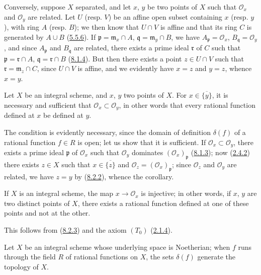 Conversely, suppose $X$ separated, and let $x$, $y$ be two points of $X$ such
that $\mathscr{O}_x$ and $\mathscr{O}_y$ are related. Let $U$ (resp.
$V$) be an affine open subset containing $x$ (resp. $y$), with ring $A$ (resp.
$B$); we then know that $U\cap V$ is affine and that its ring $C$ is generated
by $A\cup B$ (\hyperref[I.5.5.6]{5.5.6}). If
$\mathfrak p=\mathfrak m_x\cap A$, $\mathfrak q=\mathfrak m_y\cap B$, we have
$A_\mathfrak p=\mathscr{O}_x$, $B_\mathfrak q=\mathscr{O}_y$, and since
$A_\mathfrak p$ and $B_\mathfrak q$ are related, there exists a prime ideal
$\mathfrak r$ of $C$ such that $\mathfrak p=\mathfrak r\cap A$,
$\mathfrak q=\mathfrak r\cap B$ (\hyperref[I.8.1.4]{8.1.4}). But then
there exists a point $z\in U\cap V$ such that
$\mathfrak r=\mathfrak m_z\cap C$, since $U\cap V$ is affine, and we
evidently have $x=z$ and $y=z$, whence $x=y$.

\begin{corollary}[8.2.3]
\label{I.8.2.3}
Let $X$ be an integral scheme, and $x$, $y$ two points of $X$. For
$x\in\overline{\{y\}}$, it is necessary and sufficient that
$\mathscr{O}_x\subset\mathscr{O}_y$, in other words that every rational
function defined at $x$ be defined at $y$.
\end{corollary}

The condition is evidently necessary, since the domain of definition
$\delta(f)$ of a rational function $f\in R$ is open; let us show that it is
sufficient. If $\mathscr{O}_x\subset\mathscr{O}_y$, there exists a prime
ideal $\mathfrak p$ of $\mathscr{O}_x$ such that $\mathscr{O}_y$ dominates
$(\mathscr{O}_x)_\mathfrak p$ (\hyperref[I.8.1.3]{8.1.3}); now
(\hyperref[I.2.4.2]{2.4.2}) there exists $z\in X$ such that
$x\in\overline{\{z\}}$ and
$\mathscr{O}_z=(\mathscr{O}_x)_\mathfrak p$; since $\mathscr{O}_z$ and
$\mathscr{O}_y$ are related, we have $z=y$ by
(\hyperref[I.8.2.2]{8.2.2}), whence the corollary.

\begin{corollary}[8.2.4]
\label{I.8.2.4}
If $X$ is an integral scheme, the map $x\to\mathscr{O}_x$ is
injective; in other words, if $x$, $y$ are two distinct points of $X$, there
exists a rational function defined at one of these points and not at the
other.
\end{corollary}

This follows from (\hyperref[I.8.2.3]{8.2.3}) and the axiom
$(T_0)$ (\hyperref[I.2.1.4]{2.1.4}).

\begin{corollary}[8.2.5]
\label{I.8.2.5}
Let $X$ be an integral scheme whose underlying space is Noetherian; when $f$
runs through the field $R$ of rational functions on $X$, the sets
$\delta(f)$ generate the topology of $X$.
\end{corollary}

